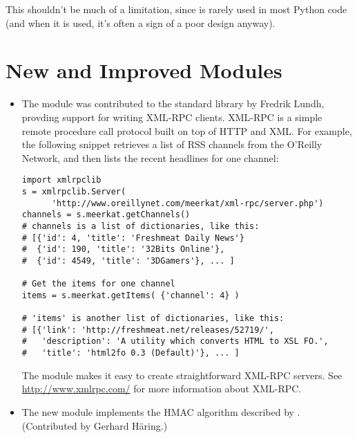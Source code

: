 \documentclass{howto}
\begin{document}
This shouldn't be much of a limitation, since  is rarely
used in most Python code (and when it is used, it's often a sign of a
poor design anyway).

\begin{seealso}


\end{seealso}


\section{New and Improved Modules}

\begin{itemize}

  \item The  module was contributed to the standard
  library by Fredrik Lundh, provding support for writing XML-RPC
  clients.  XML-RPC is a simple remote procedure call protocol built on
  top of HTTP and XML. For example, the following snippet retrieves a
  list of RSS channels from the O'Reilly Network, and then 
  lists the recent headlines for one channel:

\begin{verbatim}
import xmlrpclib
s = xmlrpclib.Server(
      'http://www.oreillynet.com/meerkat/xml-rpc/server.php')
channels = s.meerkat.getChannels()
# channels is a list of dictionaries, like this:
# [{'id': 4, 'title': 'Freshmeat Daily News'}
#  {'id': 190, 'title': '32Bits Online'},
#  {'id': 4549, 'title': '3DGamers'}, ... ]

# Get the items for one channel
items = s.meerkat.getItems( {'channel': 4} )

# 'items' is another list of dictionaries, like this:
# [{'link': 'http://freshmeat.net/releases/52719/', 
#   'description': 'A utility which converts HTML to XSL FO.', 
#   'title': 'html2fo 0.3 (Default)'}, ... ]
\end{verbatim}

The  module makes it easy to create
straightforward XML-RPC servers.  See \url{http://www.xmlrpc.com/} for
more information about XML-RPC.

  \item The new  module implements the HMAC
  algorithm described by .
  (Contributed by Gerhard H\"aring.)


\end{itemize}
\end{document}
